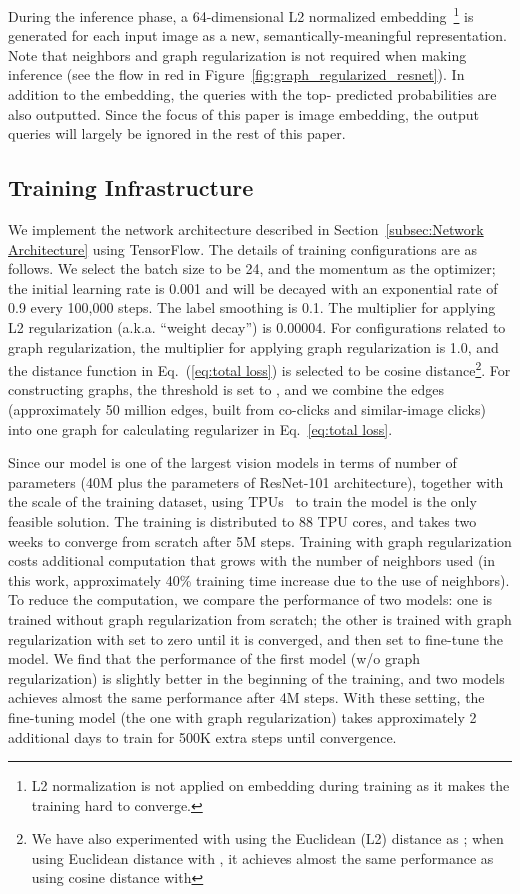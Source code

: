 \documentclass[sigconf]{acmart}
\begin{document}
During the inference phase, a 64-dimensional L2 normalized embedding~\footnote{L2 normalization is not applied on embedding during training as it makes the training hard to converge.} is generated for each input image as a new, semantically-meaningful representation. Note that neighbors and graph regularization is not required when making inference (see the flow in red in Figure~\ref{fig:graph_regularized_resnet}). In addition to the embedding, the queries with the top- predicted probabilities are also outputted. Since the focus of this paper is image embedding, the output queries will largely be ignored in the rest of this paper.

\subsection{Training Infrastructure}
\label{subsec:Training Infrastructure}
We implement the network architecture described in Section~\ref{subsec:Network Architecture} using TensorFlow\cite{abadi2016tensorflow}. The details of training configurations are as follows. We select the batch size to be 24, and the momentum \cite{qian1999momentum} as the optimizer; the initial learning rate is 0.001 and will be decayed with an exponential rate of 0.9 every 100,000 steps. The label smoothing  is 0.1. The multiplier for applying L2 regularization (a.k.a. ``weight decay'') is 0.00004. For configurations related to graph regularization, the multiplier for applying graph regularization  is 1.0, and the distance function  in Eq.~(\ref{eq:total loss}) is selected to be cosine distance\footnote{We have also experimented with using the Euclidean (L2) distance as ; when using Euclidean distance with , it achieves almost the same performance as using cosine distance with }. For constructing graphs, the threshold is set to , and we combine the edges (approximately 50 million edges, built from co-clicks and similar-image clicks) into one graph for calculating regularizer  in Eq.~\ref{eq:total loss}.

Since our model is one of the largest vision models in terms of number of parameters (40M  plus the parameters of ResNet-101 architecture), together with the scale of the training dataset, using TPUs~\cite{jouppi2017datacenter} to train the model is the only feasible solution. The training is distributed to 88 TPU cores, and takes two weeks to converge from scratch after 5M steps. Training with graph regularization costs additional computation that grows with the number of neighbors used (in this work, approximately 40\% training time increase due to the use of neighbors). To reduce the computation, we compare the performance of two models: one is trained without graph regularization from scratch; the other is trained with graph regularization with  set to zero until it is converged, and then set  to fine-tune the model. We find that the performance of the first model (w/o graph regularization) is slightly better in the beginning of the training, and two models achieves almost the same performance after 4M steps. With these setting, the fine-tuning model (the one with graph regularization) takes approximately 2 additional days to train for 500K extra steps until convergence.
\end{document}
